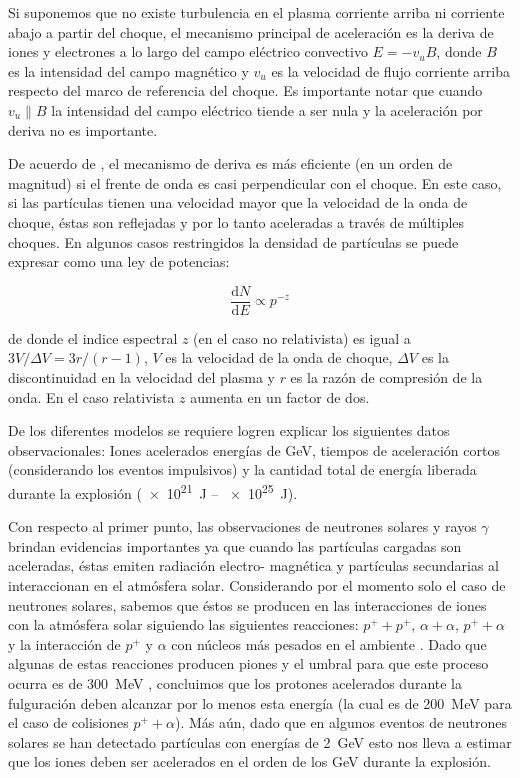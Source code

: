 \begin{itemize}
  Si suponemos que no existe turbulencia en el plasma corriente arriba ni corriente abajo a partir del choque, el mecanismo principal de aceleración es la deriva de iones y electrones a lo largo del campo eléctrico convectivo $E=-v _{u}B$, donde $B$ es la intensidad del campo magnético y $v_{u}$ es la velocidad de flujo corriente arriba respecto del marco de referencia del choque. Es importante notar que cuando $v_{u}\parallel B$ la intensidad del campo eléctrico tiende a ser nula y la aceleración por deriva no es importante.

  De acuerdo de \cite{ramaty87}, el mecanismo de deriva es más eficiente (en un orden de magnitud) si el frente de onda es casi perpendicular con el choque. En este caso, si las partículas tienen una velocidad mayor que la velocidad de la onda de choque, éstas son reflejadas y por lo tanto aceleradas a través de múltiples choques. En algunos casos restringidos la densidad de partículas se puede expresar como una ley de potencias:

  \begin{equation}
  \label{equ:shock-plaw}
  \frac{\mathrm{d}N}{\mathrm{d}E}\propto p^{-z}
  \end{equation}

  de donde el indice espectral $z$ (en el caso no relativista) es igual a $3V/\Delta V=3r/(r-1)$, $V$ es la velocidad de la onda de choque, $\Delta V$ es la discontinuidad en la velocidad del plasma y $r$ es la razón de compresión de la onda. En el caso relativista $z$ aumenta en un factor de dos.

\end{itemize}

De los diferentes modelos se requiere logren explicar los siguientes datos observacionales: Iones acelerados energías de \si{\giga\electronvolt}, tiempos de aceleración cortos (considerando los eventos impulsivos) y la cantidad total de energía liberada durante la explosión (\SI{e21}{\joule} -- \SI{e25}{\joule}).

Con respecto al primer punto, las observaciones de neutrones solares y rayos $\gamma$ brindan evidencias importantes ya que cuando las partículas cargadas son aceleradas, éstas emiten radiación electro-
magnética y partículas secundarias al interaccionan en el atmósfera solar. Considerando por el momento solo el caso de neutrones solares, sabemos que éstos se producen en las interacciones de iones con la atmósfera solar siguiendo las siguientes reacciones: $p^{+}+p^{+}$, $\alpha+\alpha$, $p^{+}+\alpha$ y la interacción de $p^{+}$ y $\alpha$ con núcleos más pesados en el ambiente \cite{diegophd}. Dado que algunas de estas reacciones producen piones y el umbral para que este proceso ocurra es de \SI{300}{\mega\electronvolt} \cite{tsuchiyaphd}, concluimos que los protones acelerados durante la fulguración deben alcanzar por lo menos esta energía (la cual es de \SI{200}{\mega\electronvolt} para el caso de colisiones $p^{+}+\alpha$). Más aún, dado que en algunos eventos de neutrones solares se han detectado partículas con energías de \SI{2}{\giga\electronvolt} esto nos lleva a estimar que los iones deben ser acelerados en el orden de los \si{\giga\electronvolt} durante la explosión.

